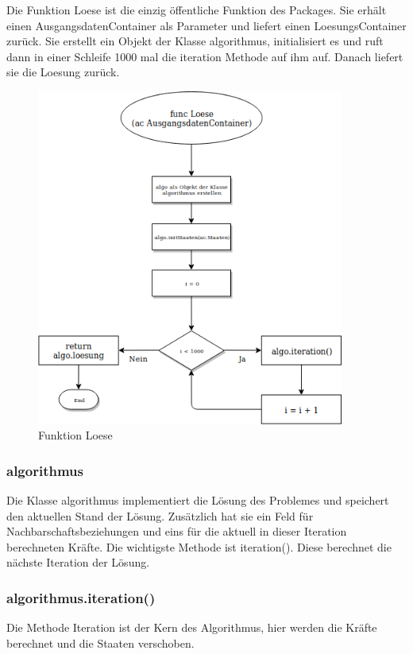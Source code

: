 Die Funktion Loese ist die einzig öffentliche Funktion des Packages.
Sie erhält einen AusgangsdatenContainer als Parameter und liefert einen LoesungsContainer zurück.
Sie erstellt ein Objekt der Klasse algorithmus, initialisiert es und ruft dann in einer Schleife 1000 mal die iteration Methode auf ihm auf.
Danach liefert sie die Loesung zurück.

\begin{figure}[h!]
    \centering
    \includegraphics[width=0.9\textwidth,]{Loese.png}
    \caption[]{Funktion Loese}
\end{figure}

\subsubsection{algorithmus}

Die Klasse algorithmus implementiert die Lösung des Problemes und speichert den aktuellen Stand der Lösung.
Zusätzlich hat sie ein Feld für Nachbarschaftsbeziehungen und eins für die aktuell in dieser Iteration berechneten Kräfte.
Die wichtigste Methode ist iteration(). Diese berechnet die nächste Iteration der Lösung.

\subsubsection{algorithmus.iteration()}
Die Methode Iteration ist der Kern des Algorithmus, hier werden die Kräfte berechnet und die Staaten verschoben.


